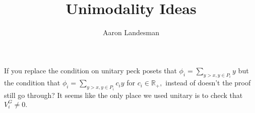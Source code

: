\documentclass{amsart}
\title{Unimodality Ideas}
\author{Aaron Landesman}
\newcommand\BR{{\mathbb R}}
\begin{document}
\maketitle

If you replace the condition on unitary peck posets that $\phi_i = \sum_{y>x,y \in P_i}^{}y$   but the condition that 
$\phi_i = \sum_{y>x,y \in P_i}^{}c_iy$ for $c_i \in \BR_+,$ instead of doesn't the proof still go through? It seems like the only place we used unitary is to check that $V_i^G\neq 0.$
\end{document}
